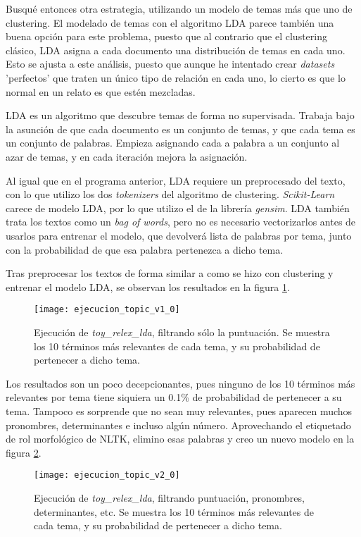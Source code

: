 \documentclass{pre-tfg}
\begin{document}
Busqué entonces otra estrategia, utilizando un modelo de temas más que uno de clustering. El modelado de temas con el algoritmo LDA parece también una buena opción para este problema, puesto que al contrario que el clustering clásico, LDA asigna a cada documento una distribución de temas en cada uno. Esto se ajusta a este análisis, puesto que aunque he intentado crear \textit{datasets} 'perfectos' que traten un único tipo de relación en cada uno, lo cierto es que lo normal en un relato es que estén mezcladas.

LDA es un algoritmo que descubre temas de forma no supervisada. Trabaja bajo la asunción de que cada documento es un conjunto de temas, y que cada tema es un conjunto de palabras. Empieza asignando cada a palabra a un conjunto al azar de temas, y en cada iteración mejora la asignación. 

Al igual que en el programa anterior, LDA requiere un preprocesado del texto, con lo que utilizo los dos \textit{tokenizers} del algoritmo de clustering. \textit{Scikit-Learn} carece de modelo LDA, por lo que utilizo el de la librería \textit{gensim}. LDA también trata los textos como un \textit{bag of words}, pero no es necesario vectorizarlos antes de usarlos para entrenar el modelo, que devolverá  lista de palabras por tema, junto con la probabilidad de que esa palabra pertenezca a dicho tema.

Tras preprocesar los textos de forma similar a como se hizo con clustering y entrenar el modelo LDA, se observan los resultados en la figura \ref{fig:topicresult1}.

\begin{figure}
	\hspace{-2cm}
	\texttt{[image: ejecucion\_topic\_v1\_0]}
	\caption{Ejecución de \textit{toy\_relex\_lda}, filtrando sólo la puntuación. Se muestra los 10 términos más relevantes de cada tema, y su probabilidad de pertenecer a dicho tema.}
	\label{fig:topicresult1}
\end{figure}

Los resultados son un poco decepcionantes, pues ninguno de los 10 términos más relevantes por tema tiene siquiera un 0.1\% de probabilidad de pertenecer a su tema.
Tampoco es sorprende que no sean muy relevantes, pues aparecen muchos pronombres, determinantes e incluso algún número. Aprovechando el etiquetado de rol morfológico de NLTK, elimino esas palabras y creo un nuevo modelo en la figura \ref{fig:topicresult2}.

\begin{figure}
	\hspace{-2cm}
	\texttt{[image: ejecucion\_topic\_v2\_0]}
	\caption{Ejecución de \textit{toy\_relex\_lda}, filtrando puntuación, pronombres, determinantes, etc. Se muestra los 10 términos más relevantes de cada tema, y su probabilidad de pertenecer a dicho tema.}
	\label{fig:topicresult2}
\end{figure}
\end{document}
